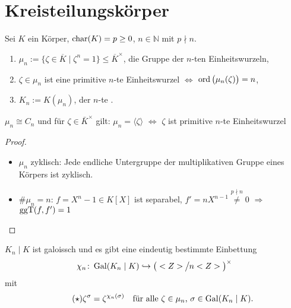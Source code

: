 \section{Kreisteilungskörper}

Sei $K$ ein Körper, $\operatorname{char}(K) = p \ge 0$, $n\in \mathbb N$ mit $p\nmid n$.

\begin{definition}
	\begin{enumerate}[label={(\arabic*)}]
		\item $\mu_n := \lbrace \zeta\in \overline K\mid \zeta^n = 1\rbrace \le \overline K^\times$, die Gruppe der $n$-ten Einheitswurzeln,
		\item $\zeta\in\mu_n$ ist eine primitive $n$-te Einheitswurzel $\Leftrightarrow$ $\operatorname{ord}\big(\mu_n(\zeta)\big) = n$,
		\item $K_n := K(\mu_n)$, der $n$-te .
	\end{enumerate}
\end{definition}

\begin{proposition}
	$\mu_n\cong C_n$ und für $\zeta\in\bar K^\times$ gilt: $\mu_n = \langle \zeta\rangle$ $\Leftrightarrow$ $\zeta$ ist primitive $n$-te Einheitswurzel
\end{proposition}

\begin{proof}
	\leavevmode
	\begin{itemize}[topsep=-6pt]
		\item $\mu_n$ zyklisch: Jede endliche Untergruppe der multiplikativen Gruppe eines Körpers ist zyklisch.
		\item $\#\mu_n = n$: $f=X^n - 1\in K[X]$ ist separabel, $f' = nX^{n-1} \overset{p\nmid n}{\neq} 0$ $\Rightarrow$ $\operatorname{ggT}(f,f') = 1$
	\end{itemize}
\end{proof}

\begin{proposition}
	$K_n\mid K$ ist galoissch und es gibt eine eindeutig bestimmte Einbettung \begin{align*}
		\chi_n\colon \operatorname{Gal}(K_n\mid K) \hookrightarrow \big(<Z>\mskip-1mu\big\slash\mskip-1mu n<Z>\big)^\times
	\end{align*}
	mit \begin{align}
		\label{eq:2_6_3_star}
		\tag{$\star$}
		\zeta^\sigma = \zeta^{\chi_n(\sigma)}\quad\text{für alle $\zeta\in \mu_n$, $\sigma\in\operatorname{Gal}(K_n\mid K)$}.
	\end{align}
\end{proposition}

